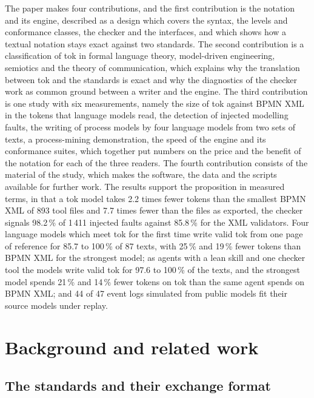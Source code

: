 \documentclass[11pt,a4paper]{article}
\begin{document}
The paper makes four contributions, and the first contribution is the notation and its engine, described as a design which covers the syntax, the levels and conformance classes, the checker and the interfaces, and which shows how a textual notation stays exact against two standards. The second contribution is a classification of tok in formal language theory, model-driven engineering, semiotics and the theory of communication, which explains why the translation between tok and the standards is exact and why the diagnostics of the checker work as common ground between a writer and the engine. The third contribution is one study with six measurements, namely the size of tok against BPMN XML in the tokens that language models read, the detection of injected modelling faults, the writing of process models by four language models from two sets of texts, a process-mining demonstration, the speed of the engine and its conformance suites, which together put numbers on the price and the benefit of the notation for each of the three readers. The fourth contribution consists of the material of the study, which makes the software, the data and the scripts available for further work. The results support the proposition in measured terms, in that a tok model takes 2.2 times fewer tokens than the smallest BPMN XML of 893 tool files and 7.7 times fewer than the files as exported, the checker signals 98.2\,\% of 1\,411 injected faults against 85.8\,\% for the XML validators. Four language models which meet tok for the first time write valid tok from one page of reference for 85.7 to 100\,\% of 87 texts, with 25\,\% and 19\,\% fewer tokens than BPMN XML for the strongest model; as agents with a lean skill and one checker tool the models write valid tok for 97.6 to 100\,\% of the texts, and the strongest model spends 21\,\% and 14\,\% fewer tokens on tok than the same agent spends on BPMN XML; and 44 of 47 event logs simulated from public models fit their source models under replay.

\section{Background and related work}\label{sec:background}

\subsection{The standards and their exchange format}
\end{document}
